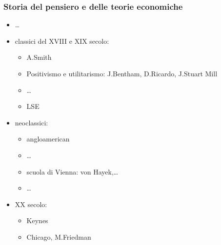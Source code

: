 \documentclass[letterpaper,10pt,italian]{jupyterBook}
\begin{document}
\subsubsection*{Storia del pensiero e delle teorie economiche}
\begin{itemize}
\item {} 
\sphinxAtStartPar
…

\item {} 
\sphinxAtStartPar
classici del XVIII e XIX secolo:
\begin{itemize}
\item {} 
\sphinxAtStartPar
A.Smith

\item {} 
\sphinxAtStartPar
Positivismo e utilitarismo: J.Bentham, D.Ricardo, J.Stuart Mill

\item {} 
\sphinxAtStartPar
…

\item {} 
\sphinxAtStartPar
LSE

\end{itemize}

\item {} 
\sphinxAtStartPar
neoclassici:
\begin{itemize}
\item {} 
\sphinxAtStartPar
anglo\sphinxhyphen{}american

\item {} 
\sphinxAtStartPar
…

\item {} 
\sphinxAtStartPar
scuola di Vienna: von Hayek,…

\item {} 
\sphinxAtStartPar
…

\end{itemize}

\item {} 
\sphinxAtStartPar
XX secolo:
\begin{itemize}
\item {} 
\sphinxAtStartPar
Keynes

\item {} 
\sphinxAtStartPar
Chicago, M.Friedman

\end{itemize}

\end{itemize}
\end{document}
